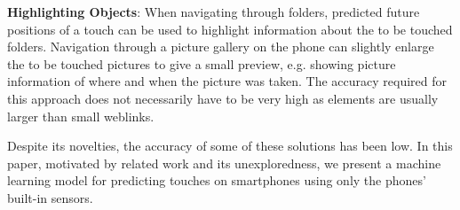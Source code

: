 \textbf{Highlighting Objects}: When navigating through folders, predicted future positions of a touch can be used to highlight information about the to be touched folders. 
Navigation through a picture gallery on the phone can slightly enlarge the to be touched pictures to give a small preview, e.g. showing picture information of where and when the picture was taken.
The accuracy required for this approach does not necessarily have to be very high as elements are usually larger than small weblinks.

Despite its novelties, the accuracy of some of these solutions has been low. In this paper, motivated by related work and its unexploredness, we present a machine learning model for predicting touches on smartphones using only the phones' built-in sensors.


